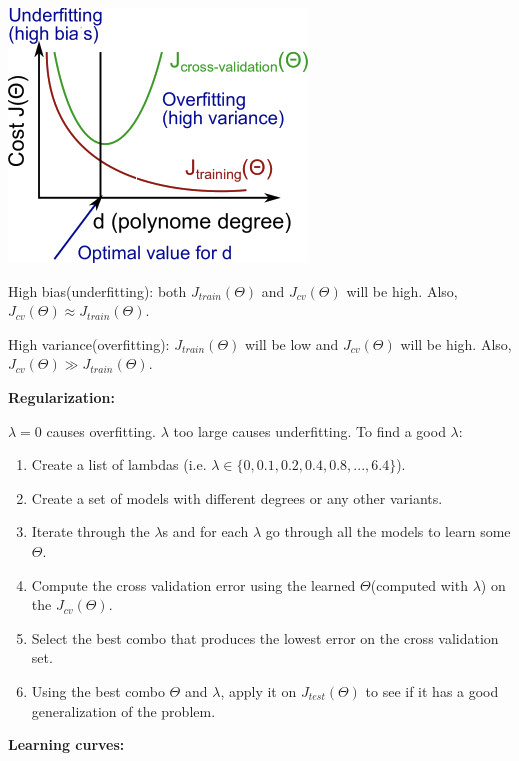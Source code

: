 \documentclass{article}
\begin{document}
\begin{center}
\includegraphics[scale=0.4]{./images/bias_and_variance_polynomial.png}
\end{center}

\noindent High bias(underfitting): both \(J_{train}(\Theta)\) and \(J_{cv}(\Theta)\) will be high. Also, \(J_{cv}(\Theta) \approx J_{train}(\Theta)\). 

\noindent High variance(overfitting): \(J_{train}(\Theta)\) will be low and \(J_{cv}(\Theta)\) will be high. Also, \(J_{cv}(\Theta) \gg J_{train}(\Theta)\). 

\bigskip

\noindent \textbf{Regularization:}

\noindent \(\lambda = 0\) causes overfitting. \(\lambda\) too large causes underfitting. To find a good \(\lambda\):

\begin{enumerate}
\item Create a list of lambdas (i.e. \(\lambda \in \{0, 0.1, 0.2, 0.4, 0.8, ..., 6.4 \}\)).
\item Create a set of models with different degrees or any other variants.
\item Iterate through the \(\lambda\)s and for each \(\lambda\) go through all the models to learn some \(\Theta\).
\item Compute the cross validation error using the learned \(\Theta\)(computed with \(\lambda\)) on the \(J_{cv}(\Theta)\).
\item Select the best combo that produces the lowest error on the cross validation set.
\item Using the best combo \(\Theta\) and \(\lambda\), apply it on \(J_{test}(\Theta)\) to see if it has a good generalization of the problem.
\end{enumerate}

\noindent \textbf{Learning curves:}
\end{document}
